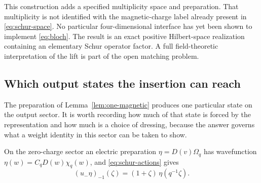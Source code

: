 This construction adds a specified multiplicity space and preparation.
That multiplicity is not identified with the magnetic-charge label
already present in \eqref{eq:schur-space}. No particular four-dimensional
interface has yet been shown to implement \eqref{eq:bloch}. The result
is an exact positive Hilbert-space realization containing an elementary
Schur operator factor. A full field-theoretic interpretation of the
lift is part of the open matching problem.

\subsection{Which output states the insertion can reach}
\label{subsec:reachable}
The preparation of Lemma~\ref{lem:one-magnetic} produces one particular state
on the output sector. It is worth recording how much of that state is forced by
the representation and how much is a choice of dressing, because the answer
governs what a weight identity in this sector can be taken to show.

On the zero-charge sector an electric preparation $\eta=D(v)\Omega_q$ has
wavefunction $\eta(w)=C_qD(w)\chi_q(w)$, and \eqref{eq:schur-actions} gives
\begin{equation}\label{eq:output-rule}
 (u_-\eta)_{-1}(\zeta)=(1+\zeta)\,\eta(q^{-1}\zeta).
\end{equation}

